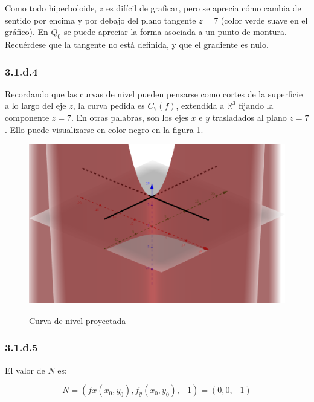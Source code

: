 \documentclass{article}
\renewcommand{\Bbb}{\mathbb}
\begin{document}
Como todo hiperboloide, $z$ es difícil de graficar, pero se aprecia cómo cambia de sentido por encima y por debajo del plano tangente $z = 7$ (color verde suave en el gráfico). En $Q_0$ se puede apreciar la forma asociada a un punto de montura. Recuérdese que la tangente no está definida, y que el gradiente es nulo. 

\subsubsection*{3.1.d.4}
\label{subsubsec:3.1.d.4}

Recordando que las curvas de nivel pueden pensarse como cortes de la superficie a lo largo del eje $z$, la curva pedida es $C_{7}(f)$, extendida a $\Bbb R^3$ fijando la componente $z = 7$. En otras palabras, son los ejes $x$ e $y$ trasladados al plano $z = 7$. Ello puede visualizarse en color negro en la figura \ref{fig:1-d-4}.

\begin{figure}[ht]
\caption{Curva de nivel proyectada}
\includegraphics[scale=0.25]{img/ejercicios/3/1-d-4.png} 
\centering
\label{fig:1-d-4}
\end{figure}

\subsubsection*{3.1.d.5}
\label{subsubsec:3.1.d.5}

El valor de $N$ es:

\begin{equation}
N = (fx(x_0,y_0), f_y(x_0,y_0), -1) = (0, 0, -1)
\end{equation}
\end{document}
